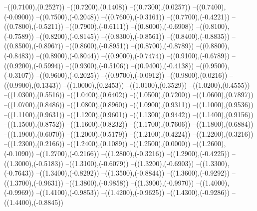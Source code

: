 {	--({\sx*(0.7100)},{\sy*(0.2527)})
	--({\sx*(0.7200)},{\sy*(0.1408)})
	--({\sx*(0.7300)},{\sy*(0.0257)})
	--({\sx*(0.7400)},{\sy*(-0.0900)})
	--({\sx*(0.7500)},{\sy*(-0.2048)})
	--({\sx*(0.7600)},{\sy*(-0.3161)})
	--({\sx*(0.7700)},{\sy*(-0.4221)})
	--({\sx*(0.7800)},{\sy*(-0.5211)})
	--({\sx*(0.7900)},{\sy*(-0.6111)})
	--({\sx*(0.8000)},{\sy*(-0.6908)})
	--({\sx*(0.8100)},{\sy*(-0.7589)})
	--({\sx*(0.8200)},{\sy*(-0.8145)})
	--({\sx*(0.8300)},{\sy*(-0.8561)})
	--({\sx*(0.8400)},{\sy*(-0.8835)})
	--({\sx*(0.8500)},{\sy*(-0.8967)})
	--({\sx*(0.8600)},{\sy*(-0.8951)})
	--({\sx*(0.8700)},{\sy*(-0.8789)})
	--({\sx*(0.8800)},{\sy*(-0.8483)})
	--({\sx*(0.8900)},{\sy*(-0.8044)})
	--({\sx*(0.9000)},{\sy*(-0.7474)})
	--({\sx*(0.9100)},{\sy*(-0.6789)})
	--({\sx*(0.9200)},{\sy*(-0.5994)})
	--({\sx*(0.9300)},{\sy*(-0.5106)})
	--({\sx*(0.9400)},{\sy*(-0.4138)})
	--({\sx*(0.9500)},{\sy*(-0.3107)})
	--({\sx*(0.9600)},{\sy*(-0.2025)})
	--({\sx*(0.9700)},{\sy*(-0.0912)})
	--({\sx*(0.9800)},{\sy*(0.0216)})
	--({\sx*(0.9900)},{\sy*(0.1343)})
	--({\sx*(1.0000)},{\sy*(0.2453)})
	--({\sx*(1.0100)},{\sy*(0.3529)})
	--({\sx*(1.0200)},{\sy*(0.4555)})
	--({\sx*(1.0300)},{\sy*(0.5516)})
	--({\sx*(1.0400)},{\sy*(0.6402)})
	--({\sx*(1.0500)},{\sy*(0.7200)})
	--({\sx*(1.0600)},{\sy*(0.7897)})
	--({\sx*(1.0700)},{\sy*(0.8486)})
	--({\sx*(1.0800)},{\sy*(0.8960)})
	--({\sx*(1.0900)},{\sy*(0.9311)})
	--({\sx*(1.1000)},{\sy*(0.9536)})
	--({\sx*(1.1100)},{\sy*(0.9631)})
	--({\sx*(1.1200)},{\sy*(0.9601)})
	--({\sx*(1.1300)},{\sy*(0.9442)})
	--({\sx*(1.1400)},{\sy*(0.9156)})
	--({\sx*(1.1500)},{\sy*(0.8752)})
	--({\sx*(1.1600)},{\sy*(0.8232)})
	--({\sx*(1.1700)},{\sy*(0.7606)})
	--({\sx*(1.1800)},{\sy*(0.6884)})
	--({\sx*(1.1900)},{\sy*(0.6070)})
	--({\sx*(1.2000)},{\sy*(0.5179)})
	--({\sx*(1.2100)},{\sy*(0.4224)})
	--({\sx*(1.2200)},{\sy*(0.3216)})
	--({\sx*(1.2300)},{\sy*(0.2166)})
	--({\sx*(1.2400)},{\sy*(0.1089)})
	--({\sx*(1.2500)},{\sy*(0.0000)})
	--({\sx*(1.2600)},{\sy*(-0.1090)})
	--({\sx*(1.2700)},{\sy*(-0.2166)})
	--({\sx*(1.2800)},{\sy*(-0.3216)})
	--({\sx*(1.2900)},{\sy*(-0.4225)})
	--({\sx*(1.3000)},{\sy*(-0.5183)})
	--({\sx*(1.3100)},{\sy*(-0.6079)})
	--({\sx*(1.3200)},{\sy*(-0.6903)})
	--({\sx*(1.3300)},{\sy*(-0.7643)})
	--({\sx*(1.3400)},{\sy*(-0.8292)})
	--({\sx*(1.3500)},{\sy*(-0.8844)})
	--({\sx*(1.3600)},{\sy*(-0.9292)})
	--({\sx*(1.3700)},{\sy*(-0.9631)})
	--({\sx*(1.3800)},{\sy*(-0.9858)})
	--({\sx*(1.3900)},{\sy*(-0.9970)})
	--({\sx*(1.4000)},{\sy*(-0.9969)})
	--({\sx*(1.4100)},{\sy*(-0.9853)})
	--({\sx*(1.4200)},{\sy*(-0.9625)})
	--({\sx*(1.4300)},{\sy*(-0.9286)})
	--({\sx*(1.4400)},{\sy*(-0.8845)})
}
